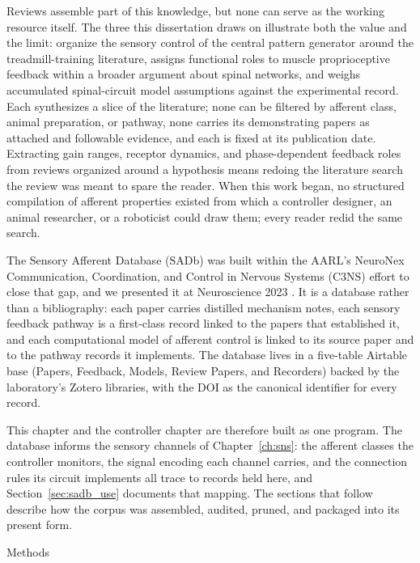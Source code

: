 Reviews assemble part of this knowledge, but none can serve as the working resource itself. The three this dissertation draws on illustrate both the value and the limit: \citet{van_de_crommert_review_1998} organize the sensory control of the central pattern generator around the treadmill-training literature, \citet{windhorst_muscle_2007} assigns functional roles to muscle proprioceptive feedback within a broader argument about spinal networks, and \citet{windhorst_spinal_2022} weighs accumulated spinal-circuit model assumptions against the experimental record. Each synthesizes a slice of the literature; none can be filtered by afferent class, animal preparation, or pathway, none carries its demonstrating papers as attached and followable evidence, and each is fixed at its publication date. Extracting gain ranges, receptor dynamics, and phase-dependent feedback roles from reviews organized around a hypothesis means redoing the literature search the review was meant to spare the reader. When this work began, no structured compilation of afferent properties existed from which a controller designer, an animal researcher, or a roboticist could draw them; every reader redid the same search.

The Sensory Afferent Database (SADb) was built within the AARL's NeuroNex Communication, Coordination, and Control in Nervous Systems (C3NS) effort to close that gap, and we presented it at Neuroscience 2023 \citep{bolen_sensory_2023}. It is a database rather than a bibliography: each paper carries distilled mechanism notes, each sensory feedback pathway is a first-class record linked to the papers that established it, and each computational model of afferent control is linked to its source paper and to the pathway records it implements. The database lives in a five-table Airtable base (Papers, Feedback, Models, Review Papers, and Recorders) backed by the laboratory's Zotero libraries, with the DOI as the canonical identifier for every record.

This chapter and the controller chapter are therefore built as one program. The database informs the sensory channels of Chapter~\ref{ch:sns}: the afferent classes the controller monitors, the signal encoding each channel carries, and the connection rules its circuit implements all trace to records held here, and Section~\ref{sec:sadb_use} documents that mapping. The sections that follow describe how the corpus was assembled, audited, pruned, and packaged into its present form.

Methods

